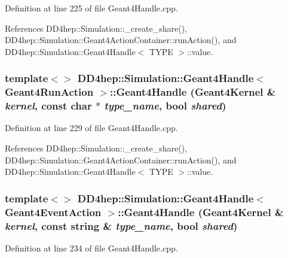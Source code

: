 Definition at line 225 of file Geant4Handle.cpp.

References DD4hep::Simulation::\_\-create\_\-share(), DD4hep::Simulation::Geant4ActionContainer::runAction(), and DD4hep::Simulation::Geant4Handle$<$ TYPE $>$::value.\hypertarget{class_d_d4hep_1_1_simulation_1_1_geant4_handle_ad5d8cc81c0f454398d4e020851e3775a}{
\subsubsection[{Geant4Handle}]{\setlength{\rightskip}{0pt plus 5cm}template$<$$>$ {\bf DD4hep::Simulation::Geant4Handle}$<$ {\bf Geant4RunAction} $>$::{\bf Geant4Handle} ({\bf Geant4Kernel} \& {\em kernel}, \/  const char $\ast$ {\em type\_\-name}, \/  bool {\em shared})}}
\label{class_d_d4hep_1_1_simulation_1_1_geant4_handle_ad5d8cc81c0f454398d4e020851e3775a}


Definition at line 229 of file Geant4Handle.cpp.

References DD4hep::Simulation::\_\-create\_\-share(), DD4hep::Simulation::Geant4ActionContainer::runAction(), and DD4hep::Simulation::Geant4Handle$<$ TYPE $>$::value.\hypertarget{class_d_d4hep_1_1_simulation_1_1_geant4_handle_aa2d10009e397e7301ebe1a6eb87aee52}{
\subsubsection[{Geant4Handle}]{\setlength{\rightskip}{0pt plus 5cm}template$<$$>$ {\bf DD4hep::Simulation::Geant4Handle}$<$ {\bf Geant4EventAction} $>$::{\bf Geant4Handle} ({\bf Geant4Kernel} \& {\em kernel}, \/  const {\bf string} \& {\em type\_\-name}, \/  bool {\em shared})}}
\label{class_d_d4hep_1_1_simulation_1_1_geant4_handle_aa2d10009e397e7301ebe1a6eb87aee52}


Definition at line 234 of file Geant4Handle.cpp.

